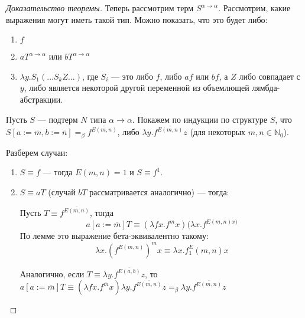 \begin{proof}[Доказательство теоремы]
Теперь рассмотрим терм $S^{\alpha\rightarrow\alpha}$. 
Рассмотрим, какие выражения могут иметь такой тип.
Можно показать, что это будет либо:
\begin{enumerate}
\item $f$
\item $a T^{\alpha\rightarrow\alpha}$ или $b T^{\alpha\rightarrow\alpha}$
\item $\lambda y.S_1 ( \dots S_k Z \dots )$, где $S_i$ --- это либо $f$, либо $a f$ или $b f$,
а $Z$ либо совпадает с $y$, либо является некоторой другой переменной из объемлющей лямбда-абстракции.
\end{enumerate}

Пусть $S$ --- подтерм $N$ типа $\alpha\rightarrow\alpha$.
Покажем по индукции по структуре $S$, что $S[a := \overline{m}, b := \overline{n}] =_\beta f^{\overline{E(m,n)}}$, 
либо $\lambda y.f^{\overline{E(m,n)}} z$ (для некоторых $m,n\in \mathbb{N}_0$).

Разберем случаи:

\begin{enumerate}
\item $S\equiv f$ --- тогда $E(m,n)=1$ и $S\equiv f^1$.
\item $S\equiv a T$ (случай $b T$ рассматривается аналогично) --- тогда:

Пусть $T\equiv f^{\overline{E(m,n)}}$, тогда
$$a[a := \overline{m}] T \equiv (\lambda fx.f^m x) (\lambda x.f^{E(m,n) x)}$$
По лемме это выражение бета-эквивалентно такому:
$$\lambda x.(f^{E(m,n)})^m x \equiv \lambda x.f^E_1(m,n) x$$

Аналогично, если $T\equiv \lambda y.f^{\overline{E(a,b)}} z$, то
$a[a := \overline{m}] T \equiv (\lambda fx.f^{\overline{m}} x) \lambda y.f^{\overline{E(m,n)}} z 
=_\beta \lambda y.f^{\overline{E(m,n)}}z$
\end{enumerate}





\end{proof}